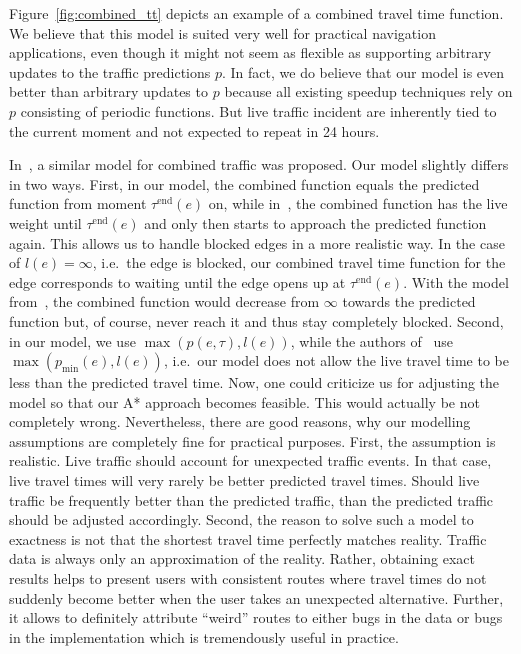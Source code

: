 \documentclass[a4paper,UKenglish,cleveref, autoref, thm-restate,anonymous]{lipics-v2021}
\begin{document}
Figure~\ref{fig:combined_tt} depicts an example of a combined travel time function.
We believe that this model is suited very well for practical navigation applications, even though it might not seem as flexible as supporting arbitrary updates to the traffic predictions $p$.
In fact, we do believe that our model is even better than arbitrary updates to $p$ because all existing speedup techniques rely on $p$ consisting of periodic functions.
But live traffic incident are inherently tied to the current moment and not expected to repeat in 24 hours.

In~\cite{strasser_et_al:LIPIcs.SEA.2021.6}, a similar model for combined traffic was proposed.
Our model slightly differs in two ways.
First, in our model, the combined function equals the predicted function from moment $\tau^{\operatorname{end}}(e)$ on, while in~\cite{strasser_et_al:LIPIcs.SEA.2021.6}, the combined function has the live weight until $\tau^{\operatorname{end}}(e)$ and only then starts to approach the predicted function again.
This allows us to handle blocked edges in a more realistic way.
In the case of $l(e) = \infty$, i.e.\ the edge is blocked, our combined travel time function for the edge corresponds to waiting until the edge opens up at $\tau^{\operatorname{end}}(e)$.
With the model from~\cite{strasser_et_al:LIPIcs.SEA.2021.6}, the combined function would decrease from $\infty$ towards the predicted function but, of course, never reach it and thus stay completely blocked.
Second, in our model, we use $\max(p(e, \tau), l(e))$, while the authors of~\cite{strasser_et_al:LIPIcs.SEA.2021.6} use $\max(p_{\min}(e), l(e))$, i.e.\ our model does not allow the live travel time to be less than the predicted travel time.
Now, one could criticize us for adjusting the model so that our A* approach becomes feasible.
This would actually be not completely wrong.
Nevertheless, there are good reasons, why our modelling assumptions are completely fine for practical purposes.
First, the assumption is realistic.
Live traffic should account for unexpected traffic events.
In that case, live travel times will very rarely be better predicted travel times.
Should live traffic be frequently better than the predicted traffic, than the predicted traffic should be adjusted accordingly.
Second, the reason to solve such a model to exactness is not that the shortest travel time perfectly matches reality.
Traffic data is always only an approximation of the reality.
Rather, obtaining exact results helps to present users with consistent routes where travel times do not suddenly become better when the user takes an unexpected alternative.
Further, it allows to definitely attribute ``weird'' routes to either bugs in the data or bugs in the implementation which is tremendously useful in practice.
\end{document}

